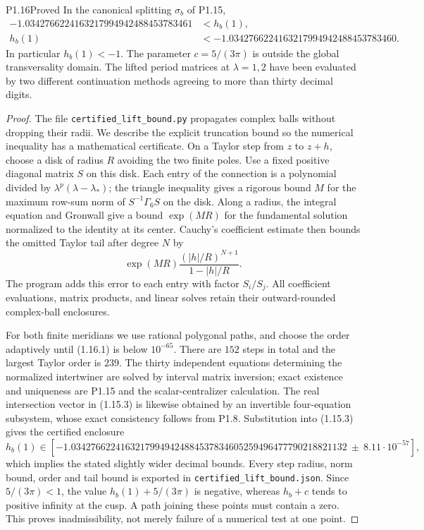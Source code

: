 \begin{statement}{P1.16}{Proved}
In the canonical splitting $\sigma_b$ of P1.15,
\[
\begin{aligned}
-1.0342766224163217994942488453783461&<h_b(1),\\
h_b(1)&<-1.0342766224163217994942488453783460.
\end{aligned}
\]
In particular $h_b(1)<-1$.  The parameter $c=5/(3\pi)$ is outside the
global transversality domain.  The lifted period matrices at
$\lambda=1,2$ have been evaluated by two different continuation methods
agreeing to more than thirty decimal digits.
\end{statement}
\begin{proof}
The file \texttt{certified\_lift\_bound.py} propagates complex balls
without dropping their radii.  We describe the explicit truncation
bound so the numerical inequality has a mathematical certificate.
On a Taylor step from $z$ to $z+h$, choose a disk of radius $R$ avoiding
the two finite poles.  Use a fixed positive diagonal matrix $S$ on
this disk.  Each entry of the connection is a polynomial divided by
$\lambda^p(\lambda-\lambda_*)$; the triangle inequality gives a
rigorous bound $M$ for the maximum row-sum norm of
$S^{-1}\Gamma_6S$ on the disk.  Along a radius, the integral equation
and Gronwall give a bound $\exp(MR)$ for the fundamental solution
normalized to the identity at its center.  Cauchy's coefficient
estimate then bounds the omitted Taylor tail after degree $N$ by
\[
\exp(MR)\frac{(|h|/R)^{N+1}}{1-|h|/R}.
\tag{1.16.1}
\]
The program adds this error to each entry with factor $S_i/S_j$.
All coefficient evaluations, matrix products, and linear solves retain
their outward-rounded complex-ball enclosures.

For both finite meridians we use rational polygonal paths, and choose
the order adaptively until (1.16.1) is below $10^{-65}$.
There are $152$ steps in total and the largest Taylor order is $239$.
The thirty independent equations determining the normalized
intertwiner are solved by interval matrix inversion; exact existence
and uniqueness are P1.15 and the scalar-centralizer calculation.
The real intersection vector in (1.15.3) is likewise obtained by an
invertible four-equation subsystem, whose exact consistency follows
from P1.8.  Substitution into (1.15.3) gives the certified enclosure
\[
h_b(1)\in
[-1.03427662241632179949424884537834605259496477790218821132
 \ \mathbin{\pm}\ 8.11\cdot10^{-57}],
\]
which implies the stated slightly wider decimal bounds.
Every step radius, norm bound, order and tail bound is exported in
\texttt{certified\_lift\_bound.json}.  Since $5/(3\pi)<1$, the value
$h_b(1)+5/(3\pi)$ is negative, whereas $h_b+c$ tends to positive
infinity at the cusp.  A path joining these points must contain a
zero.  This proves inadmissibility, not merely failure of a numerical
test at one point.


\end{proof}

